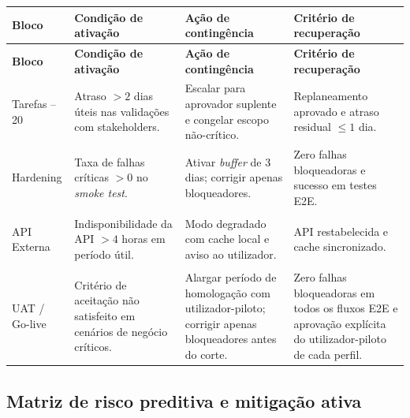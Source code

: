 \documentclass[11pt,a4paper,twoside]{article}
\newcommand{\tH}[1]{\textbf{\sffamily\small\color{white}#1}}
\newcommand{\theadrow}{\rowcolor{ACCENT}}
\begin{document}
\begin{longtable}{>{\small\bfseries}p{1.8cm} >{\small\raggedright\arraybackslash}p{4.0cm} >{\small\raggedright\arraybackslash}p{4.4cm} >{\small\raggedright\arraybackslash}p{4.0cm}}
\theadrow
\tH{Bloco} & \tH{Condição de ativação} & \tH{Ação de contingência} & \tH{Critério de recuperação} \\
\midrule
\endfirsthead
\theadrow
\tH{Bloco} & \tH{Condição de ativação} & \tH{Ação de contingência} & \tH{Critério de recuperação} \\
\midrule
\endhead

Tarefas \newline16--20 & Atraso $>2$ dias úteis nas validações com stakeholders. & Escalar para aprovador suplente e congelar escopo não-crítico. & Replaneamento aprovado e atraso residual $\leq 1$ dia. \\ \addlinespace[4pt]

Hardening & Taxa de falhas críticas $>0$ no \textit{smoke test}. & Ativar \textit{buffer} de 3 dias; corrigir apenas bloqueadores. & Zero falhas bloqueadoras e sucesso em testes E2E. \\ \addlinespace[4pt]

API \newline Externa & Indisponibilidade da API $>4$ horas em período útil. & Modo degradado com cache local e aviso ao utilizador. & API restabelecida e cache sincronizado. \\ \addlinespace[4pt]

UAT / \newline Go-live & Critério de aceitação não satisfeito em cenários de negócio críticos. & Alargar período de homologação com utilizador-piloto; corrigir apenas bloqueadores antes do corte. & Zero falhas bloqueadoras em todos os fluxos E2E e aprovação explícita do utilizador-piloto de cada perfil. \\
\bottomrule
\end{longtable}

\subsection{Matriz de risco preditiva e mitigação ativa}
\end{document}
